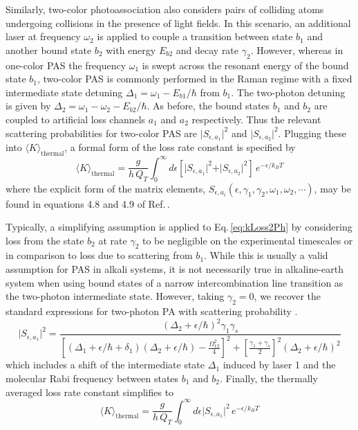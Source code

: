 Similarly, two-color photoassociation also considers pairs of colliding atoms undergoing collisions in the presence of light fields.
In this scenario, an additional laser at frequency $\omega_2$ is applied to couple a transition between state $b_1$ and another bound state $b_2$ with energy $E_{b2}$ and decay rate $\gamma_2$.
However, whereas in one-color PAS the frequency $\omega_1$ is swept across the resonant energy of the bound state $b_1$, two-color PAS is commonly performed in the Raman regime with a fixed intermediate state detuning $\Delta_1 = \omega_1 - E_{b1}/\hbar$ from $b_1$.
The two-photon detuning is given by $\Delta_2 = \omega_1 - \omega_2 - E_{b2}/\hbar$.
As before, the bound states $b_1$ and $b_2$ are coupled to artificial loss channels $a_1$ and $a_2$ respectively.
Thus the relevant scattering probabilities for two-color PAS are $\vert S_{\epsilon, a_1} \vert^2$ and $\vert S_{\epsilon, a_2} \vert^2$.
Plugging these into $\langle K \rangle_\text{thermal}$, a formal form of the loss rate constant is specified by
\begin{equation} \label{eq:kLoss2Ph}
  \langle K \rangle_\text{thermal} = \frac{g}{h\,Q_{T}} \int_{0}^{\infty} d\epsilon \left[ \vert S_{\epsilon, a_1} \vert^2 + \vert S_{\epsilon, a_2} \vert^2 \right] \,e^{-\epsilon/k_{B}T}
\end{equation}
where the explicit form of the matrix elements, $S_{\epsilon, a_i}(\epsilon,\gamma_1,\gamma_2,\omega_1,\omega_2,\cdots)$, may be found in equations 4.8 and 4.9 of Ref.\,\cite{Bohn1999}.

Typically, a simplifying assumption is applied to Eq.\,\ref{eq:kLoss2Ph} by considering loss from the state $b_2$ at rate $\gamma_2$ to be negligible on the experimental timescales or in comparison to loss due to scattering from $b_1$.
While this is usually a valid assumption for PAS in alkali systems, it is not necessarily true in alkaline-earth system when using bound states of a narrow intercombination line transition as the two-photon intermediate state.
However, taking $\gamma_2=0$, we recover the standard expressions for two-photon PA with scattering probability \cite{MartinezDeEscobar2008,Jones2006,Napolitano1994,Pachomov2017}.
\begin{equation} \label{eq:twoPhotonSe1}
	\vert  S_{\epsilon, a_1} \vert^2 = \frac{(\Delta_2 + \epsilon/\hbar)^2 \gamma_1 \gamma_s}{
  	\left[ (\Delta_1+\epsilon/\hbar+\delta_1) (\Delta_2+\epsilon/\hbar)-\frac{\Omega_{12}^{2}}{4}\right]^2 + \left[ \frac{\gamma_1 + \gamma_s}{2}\right]^2 (\Delta_2+\epsilon/\hbar)^2}
\end{equation}
which includes a shift of the intermediate state $\Delta_1$ induced by laser 1 and the molecular Rabi frequency between states $b_1$ and $b_2$.
Finally, the thermally averaged loss rate constant simplifies to
\begin{equation} \label{eq:twoPhotonKavg}
	\langle K \rangle_\text{thermal}  = \frac{g}{h\,Q_{T}} \int_{0}^{\infty} d\epsilon \vert  S_{\epsilon, a_1} \vert^2 \,e^{-\epsilon/k_{B}T}
\end{equation}

